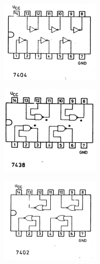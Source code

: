 \documentclass[a4paper,12pt]{article}
\begin{document}
\begin{table}[h!]
\centering
\begin{minipage}{5cm}
   \centering
   \includegraphics[width=5cm]{grafika/cemi/6not.png}
\end{minipage}
\begin{minipage}{5cm}
   \centering
   \includegraphics[width=5cm]{grafika/cemi/4nand.png}
\end{minipage}
\begin{minipage}{5cm}
   \centering
   \includegraphics[width=5cm]{grafika/cemi/4nor.png}
\end{minipage}


\end{table}
\end{document}
